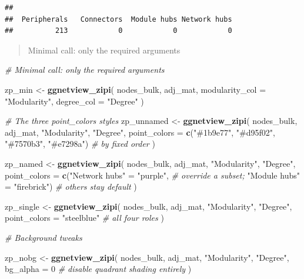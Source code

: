 \documentclass[
]{book}
\newenvironment{Shaded}{\begin{snugshade}}{\end{snugshade}}
\newcommand{\AttributeTok}[1]{\textcolor[rgb]{0.13,0.29,0.53}{#1}}
\newcommand{\CommentTok}[1]{\textcolor[rgb]{0.56,0.35,0.01}{\textit{#1}}}
\newcommand{\DecValTok}[1]{\textcolor[rgb]{0.00,0.00,0.81}{#1}}
\newcommand{\FunctionTok}[1]{\textcolor[rgb]{0.13,0.29,0.53}{\textbf{#1}}}
\newcommand{\NormalTok}[1]{#1}
\newcommand{\OtherTok}[1]{\textcolor[rgb]{0.56,0.35,0.01}{#1}}
\newcommand{\StringTok}[1]{\textcolor[rgb]{0.31,0.60,0.02}{#1}}
\begin{document}
\begin{verbatim}
## 
##  Peripherals   Connectors  Module hubs Network hubs 
##          213            0            0            0
\end{verbatim}

\begin{quote}
Minimal call: only the required arguments
\end{quote}

\begin{Shaded}
\begin{Highlighting}[]
\CommentTok{\#  Minimal call: only the required arguments}

\NormalTok{zp\_min }\OtherTok{\textless{}{-}} \FunctionTok{ggnetview\_zipi}\NormalTok{(}
\NormalTok{  nodes\_bulk, adj\_mat,}
  \AttributeTok{modularity\_col =} \StringTok{"Modularity"}\NormalTok{,}
  \AttributeTok{degree\_col     =} \StringTok{"Degree"}
\NormalTok{)}


\CommentTok{\# The three point\_colors styles}
\NormalTok{zp\_unnamed }\OtherTok{\textless{}{-}} \FunctionTok{ggnetview\_zipi}\NormalTok{(}
\NormalTok{  nodes\_bulk, adj\_mat, }\StringTok{"Modularity"}\NormalTok{, }\StringTok{"Degree"}\NormalTok{,}
  \AttributeTok{point\_colors =} \FunctionTok{c}\NormalTok{(}\StringTok{"\#1b9e77"}\NormalTok{, }\StringTok{"\#d95f02"}\NormalTok{, }\StringTok{"\#7570b3"}\NormalTok{, }\StringTok{"\#e7298a"}\NormalTok{)  }\CommentTok{\# by fixed order}
\NormalTok{)}

\NormalTok{zp\_named }\OtherTok{\textless{}{-}} \FunctionTok{ggnetview\_zipi}\NormalTok{(}
\NormalTok{  nodes\_bulk, adj\_mat, }\StringTok{"Modularity"}\NormalTok{, }\StringTok{"Degree"}\NormalTok{,}
  \AttributeTok{point\_colors =} \FunctionTok{c}\NormalTok{(}\StringTok{"Network hubs"} \OtherTok{=} \StringTok{"purple"}\NormalTok{,                  }\CommentTok{\# override a subset;}
                   \StringTok{"Module hubs"}  \OtherTok{=} \StringTok{"firebrick"}\NormalTok{)               }\CommentTok{\# others stay default}
\NormalTok{)}

\NormalTok{zp\_single }\OtherTok{\textless{}{-}} \FunctionTok{ggnetview\_zipi}\NormalTok{(}
\NormalTok{  nodes\_bulk, adj\_mat, }\StringTok{"Modularity"}\NormalTok{, }\StringTok{"Degree"}\NormalTok{,}
  \AttributeTok{point\_colors =} \StringTok{"steelblue"}                                   \CommentTok{\# all four roles}
\NormalTok{)}

\CommentTok{\# Background tweaks}

\NormalTok{zp\_nobg }\OtherTok{\textless{}{-}} \FunctionTok{ggnetview\_zipi}\NormalTok{(}
\NormalTok{  nodes\_bulk, adj\_mat, }\StringTok{"Modularity"}\NormalTok{, }\StringTok{"Degree"}\NormalTok{,}
  \AttributeTok{bg\_alpha =} \DecValTok{0}                       \CommentTok{\# disable quadrant shading entirely}
\NormalTok{)}
\end{Highlighting}
\end{Shaded}
\end{document}
